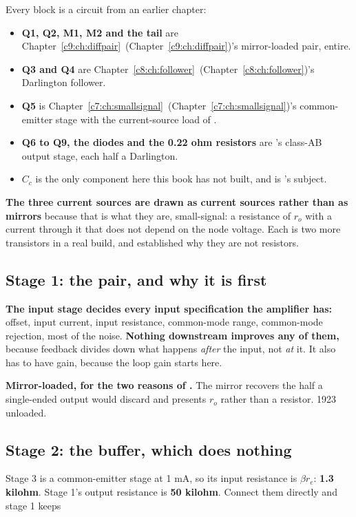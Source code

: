 Every block is a circuit from an earlier chapter:

\begin{itemize}
  \item \textbf{Q1, Q2, M1, M2 and the tail} are Chapter~\ref{c9:ch:diffpair}~(Chapter~\ref{c9:ch:diffpair})'s mirror-loaded pair, entire.
  \item \textbf{Q3 and Q4} are Chapter~\ref{c8:ch:follower}~(Chapter~\ref{c8:ch:follower})'s Darlington follower.
  \item \textbf{Q5} is Chapter~\ref{c7:ch:smallsignal}~(Chapter~\ref{c7:ch:smallsignal})'s common-emitter stage with the current-source load of .
  \item \textbf{Q6 to Q9, the diodes and the 0.22 ohm resistors} are 's class-AB output stage, each half a Darlington.
  \item \textbf{$C_c$} is the only component here this book has not built, and is 's subject.
\end{itemize}
\textbf{The three current sources are drawn as current sources rather than as mirrors} because that is what they are, small-signal: a resistance of $r_o$ with a current through it that does not depend on the node voltage. Each is two more transistors in a real build, and  established why they are not resistors.

\subsection{Stage 1: the pair, and why it is first}
\label{c10:sec:a3}
\textbf{The input stage decides every input specification the amplifier has:} offset, input current, input resistance, common-mode range, common-mode rejection, most of the noise. \textbf{Nothing downstream improves any of them,} because feedback divides down what happens \emph{after} the input, not \emph{at} it. It also has to have gain, because the loop gain starts here.

\textbf{Mirror-loaded, for the two reasons of .} The mirror recovers the half a single-ended output would discard and presents $r_o$ rather than a resistor. 1923 unloaded.

\subsection{Stage 2: the buffer, which does nothing}
\label{c10:sec:a4}
Stage 3 is a common-emitter stage at 1 mA, so its input resistance is $\beta r_e$: \textbf{1.3 kilohm}. Stage 1's output resistance is \textbf{50 kilohm}. Connect them directly and stage 1 keeps

